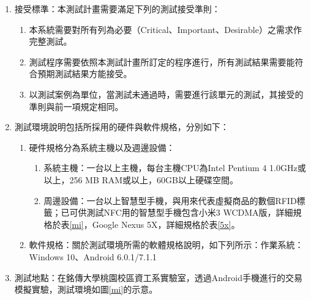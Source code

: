 	 		\begin{enumerate}
	 			
	 			\item 接受標準：本測試計畫需要滿足下列的測試接受準則： 

	 			\begin{enumerate}
					\item 本系統需要對所有列為必要（Critical、Important、Desirable）之需求作完整測試。
					\item 測試程序需要依照本測試計畫所訂定的程序進行，所有測試結果需要能符合預期測試結果方能接受。
					\item 以測試案例為單位，當測試未通過時，需要進行該單元的測試，其接受的準則與前一項規定相同。 
				\end{enumerate}

				\item 測試環境說明包括所採用的硬件與軟件規格，分別如下：
				\begin{enumerate}
					\item 硬件規格分為系統主機以及週邊設備：
					
					\begin{enumerate}
						\item 系統主機：一台以上主機，每台主機CPU為Intel Pentium 4 1.0GHz或以上，256 MB RAM或以上，60GB以上硬碟空間。
						\item 周邊設備：一台以上智慧型手機，與用來代表虛擬商品的數個RFID標籤；已可供測試NFC用的智慧型手機包含小米3 WCDMA版，詳細規格於表\ref{mi}，Google Nexus 5X，詳細規格於表\ref{5x}。
					
					\end{enumerate}
					\item 軟件規格：關於測試環境所需的軟體規格說明，如下列所示：作業系統：Windows 10、Android 6.0.1/7.1.1

				\end{enumerate}
				\item 測試地點：在銘傳大學桃園校區資工系實驗室，透過Android手機進行的交易模擬實驗，測試環境如圖\ref{mi}的示意。

	 	


\end{enumerate}
